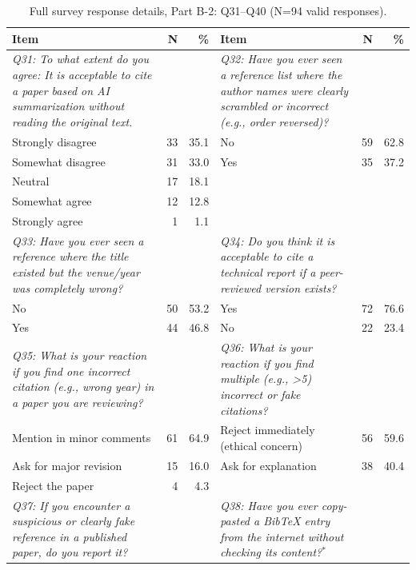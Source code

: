\begin{table}[htbp]
  \centering
  \begin{threeparttable}
    \caption{Full survey response details, Part B-2: Q31--Q40 (N=94 valid responses).}
    \label{tab:survey_details_full_b2}
    \small
    \begin{tabular}{p{6cm}rr|p{6cm}rr}
\toprule
\textbf{Item} & \textbf{N} & \textbf{\%} & \textbf{Item} & \textbf{N} & \textbf{\%} \\
\midrule
\textit{Q31: To what extent do you agree: It is acceptable to cite a paper based on AI summarization without reading the original text.} & & & \textit{Q32: Have you ever seen a reference list where the author names were clearly scrambled or incorrect (e.g., order reversed)?} & & \\
\rowcolor{tableRowLight}
Strongly disagree & 33 & 35.1 & No & 59 & 62.8 \\
Somewhat disagree & 31 & 33.0 & Yes & 35 & 37.2 \\
\rowcolor{tableRowLight}
Neutral & 17 & 18.1 &  &  &  \\
Somewhat agree & 12 & 12.8 &  &  &  \\
\rowcolor{tableRowLight}
Strongly agree & 1 & 1.1 &  &  &  \\
\midrule
\textit{Q33: Have you ever seen a reference where the title existed but the venue/year was completely wrong?} & & & \textit{Q34: Do you think it is acceptable to cite a technical report if a peer-reviewed version exists?} & & \\
\rowcolor{tableRowLight}
No & 50 & 53.2 & Yes & 72 & 76.6 \\
Yes & 44 & 46.8 & No & 22 & 23.4 \\
\midrule
\textit{Q35: What is your reaction if you find one incorrect citation (e.g., wrong year) in a paper you are reviewing?} & & & \textit{Q36: What is your reaction if you find multiple (e.g., >5) incorrect or fake citations?} & & \\
\rowcolor{tableRowLight}
Mention in minor comments & 61 & 64.9 & Reject immediately (ethical concern) & 56 & 59.6 \\
Ask for major revision & 15 & 16.0 & Ask for explanation & 38 & 40.4 \\
\rowcolor{tableRowLight}
Reject the paper & 4 & 4.3 &  &  &  \\
\midrule
\textit{Q37: If you encounter a suspicious or clearly fake reference in a published paper, do you report it?} & & & \textit{Q38: Have you ever copy-pasted a BibTeX entry from the internet without checking its content?}$^*$ & & \\

\end{tabular}
\end{threeparttable}
\end{table}
